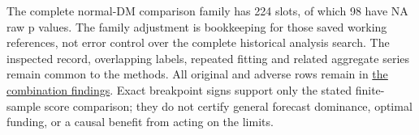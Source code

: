 The complete normal-DM comparison family has 224 slots,
of which 98 have NA raw p values.
The family adjustment is bookkeeping for those saved working references, not
error control over the complete historical analysis search. The inspected
record, overlapping labels, repeated fitting and related aggregate series
remain common to the methods. All original and adverse rows remain in
\href{https://github.com/ByronLi0207/financial-mathematics-paper-20261020/blob/revision-v7-final/results/revision-20261023/v6/wp3-findings.json}{the combination findings}.
Exact breakpoint signs support only the stated finite-sample score comparison;
they do not certify general forecast dominance, optimal funding, or a causal
benefit from acting on the limits.